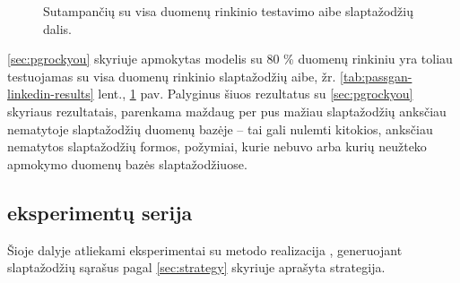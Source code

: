 \documentclass{VUMIFInfBakalaurinis}
\begin{document}
\begin{figure}[!ht]
  \begin{center}
  \end{center}
  \caption{
    Sutampančių su visa  duomenų rinkinio testavimo aibe 
    slaptažodžių dalis.
  }
  \label{plot:passgan-linkedin-results}
\end{figure}
\ref{sec:pgrockyou} skyriuje apmokytas modelis su 80 \%  
duomenų rinkiniu yra toliau testuojamas su visa  duomenų 
rinkinio slaptažodžių aibe, žr. \ref{tab:passgan-linkedin-results} lent., 
\ref{plot:passgan-linkedin-results} pav. Palyginus šiuos rezultatus su 
\ref{sec:pgrockyou} skyriaus rezultatais, parenkama maždaug per pus mažiau 
slaptažodžių anksčiau nematytoje slaptažodžių duomenų bazėje -- tai gali nulemti 
kitokios, anksčiau nematytos slaptažodžių formos, požymiai, kurie nebuvo arba 
kurių neužteko apmokymo duomenų bazės slaptažodžiuose.

\subsection{ eksperimentų serija}
Šioje dalyje atliekami eksperimentai su  metodo realizacija 
\cite{PCFG:impl}, generuojant slaptažodžių sąrašus pagal \ref{sec:strategy} 
skyriuje aprašyta strategija.
\end{document}
